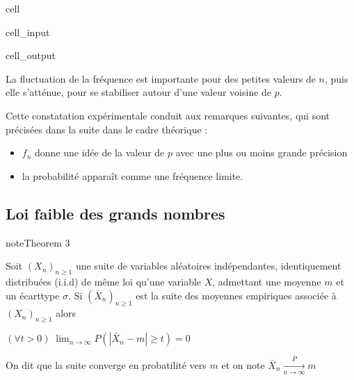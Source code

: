 \documentclass[letterpaper,10pt,french]{sphinxmanual}
\begin{document}
\begin{sphinxuseclass}{cell}
\begin{sphinxuseclass}{cell_input}
\begin{sphinxVerbatim}[commandchars=\\\{\}]
\end{sphinxVerbatim}

\end{sphinxuseclass}
\begin{sphinxuseclass}{cell_output}
\noindent{}

\end{sphinxuseclass}
\end{sphinxuseclass}
\sphinxAtStartPar
La fluctuation de la fréquence est importante pour des petites valeurs de \(n\), puis elle s’atténue, pour se stabiliser autour d’une valeur voisine de \(p\).

\sphinxAtStartPar
Cette constatation expérimentale conduit aux remarques suivantes, qui sont précisées dans la suite dans le cadre théorique :
\begin{itemize}
\item {} 
\sphinxAtStartPar
\(f_n\) donne une idée de la valeur de \(p\) avec une plus ou moins grande précision

\item {} 
\sphinxAtStartPar
la probabilité apparaît comme une fréquence limite.

\end{itemize}


\subsection{Loi faible des grands nombres}
\label{\detokenize{elemstats:loi-faible-des-grands-nombres}}\label{elemstats:theorem-6}
\begin{sphinxadmonition}{note}{Theorem 3}



\sphinxAtStartPar
Soit \((X_n)_{n\geq 1}\) une suite de variables aléatoires indépendantes, identiquement distribuées (i.i.d) de même loi qu’une variable \(X\), admettant une moyenne \(m\) et un écart\sphinxhyphen{}type \(\sigma\). Si \((\bar{X}_n)_{n\geq 1}\) est la suite des moyennes empiriques associée à \((X_n)_{n\geq 1}\) alors

\sphinxAtStartPar
\((\forall t>0)\; \displaystyle\lim_{n\rightarrow\infty} P(|\bar{X}_n-m|\geq t) = 0\)

\sphinxAtStartPar
On dit que la suite converge en probatilité vers \(m\) et on note \(\bar{X}_n\xrightarrow[n\rightarrow\infty]{P} m\)
\end{sphinxadmonition}
\end{document}
